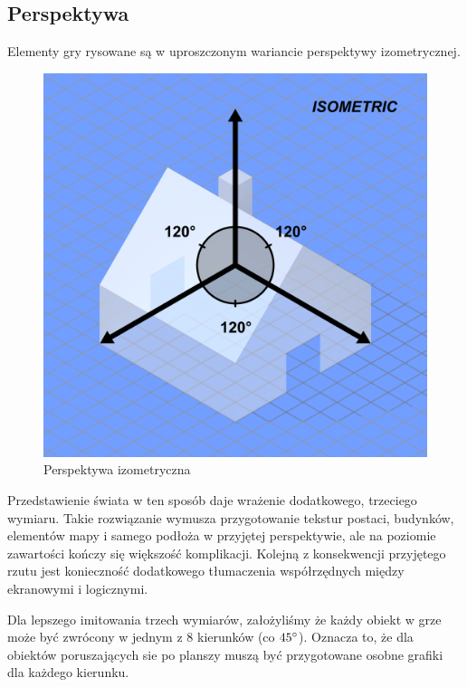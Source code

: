 \documentclass[licencjacka]{pracamgr}
\begin{document}
    \subsection{Perspektywa}
      Elementy gry rysowane są w uproszczonym wariancie perspektywy izometrycznej.

      \begin{figure}[htbp]
	\centering
	\includegraphics[scale=0.25]{izo.png}
	\caption[BLAH]{Perspektywa izometryczna\protect\footnotemark}
      \end{figure}


      Przedstawienie świata w ten sposób daje wrażenie dodatkowego, trzeciego wymiaru. Takie rozwiązanie wymusza przygotowanie tekstur
      postaci, budynków, elementów mapy i samego podłoża w przyjętej perspektywie, ale na poziomie
      zawartości kończy się większość komplikacji. Kolejną z konsekwencji przyjętego rzutu jest konieczność dodatkowego tłumaczenia
      współrzędnych między ekranowymi i logicznymi.

      Dla lepszego imitowania trzech wymiarów, założyliśmy że każdy obiekt w grze może być zwrócony w jednym z 8 kierunków
      (co $45\degree$). Oznacza to, że dla obiektów poruszających sie po planszy muszą być przygotowane osobne grafiki dla każdego kierunku.
\end{document}
